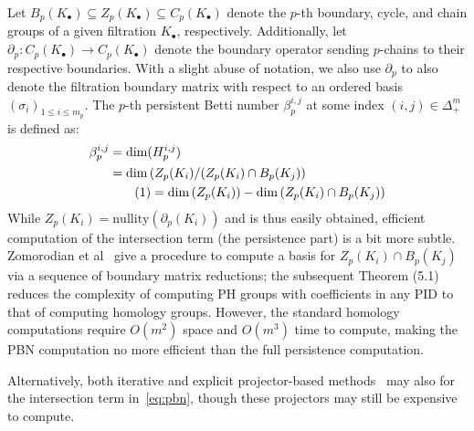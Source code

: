 \documentclass[10pt]{article}
\newcommand{\+}{%
	\raisebox{0.18ex}{\scaleobj{0.55}{+}}
}
\newcommand\numberthis{\addtocounter{equation}{1}\tag{\theequation}}
\begin{document}
Let $B_p(K_\bullet) \subseteq Z_p(K_\bullet) \subseteq C_p(K_\bullet)$ denote the $p$-th boundary, cycle, and chain groups of a given filtration $K_\bullet$, respectively. 
Additionally, let $\partial_p : C_p( K_{\bullet}) \to C_p(K_{\bullet})$ denote the boundary operator sending $p$-chains to their respective boundaries. 
With a slight abuse of notation, we also use $\partial_p$ to also denote the filtration boundary matrix with respect to an ordered basis $(\sigma_i)_{1 \leq i \leq m_p}$.  
The $p$-th persistent Betti number $\beta_p^{i,j}$ at some index $(i,j) \in \Delta_+^m$ is defined as: 
\begin{align*} \label{eq:pbn}
	\beta_p^{i,j} &= \mathrm{dim}(H_p^{i,j}) \\
	&= \mathrm{dim} \left( Z_p(K_i) / (Z_p(K_i) \cap B_p(K_j) \right) \\
	& \numberthis = \mathrm{dim} \left( Z_p(K_i) \right) - \mathrm{dim}\left( Z_p(K_i) \cap B_p(K_j) \right ) 
\end{align*}
While $Z_p(K_i) = \mathrm{nullity}(\partial_p(K_i))$ and is thus easily obtained, efficient computation of the intersection term (the persistence part) is a bit more subtle. Zomorodian et al~\cite{zomorodian2004computing} give a procedure to compute a basis for $Z_p(K_i) \cap B_p(K_j)$ via a sequence of boundary matrix reductions; the subsequent Theorem (5.1) reduces the complexity of computing PH groups with coefficients in any PID to that of computing homology groups. However, the standard homology computations require $O(m^2)$ space and $O(m^3)$ time to compute, making the PBN computation no more efficient than the full persistence computation.

Alternatively, both iterative and explicit projector-based methods~\cite{ben2015projectors} may also for the intersection term in~\eqref{eq:pbn}, though these projectors may still be expensive to compute. 
\end{document}
